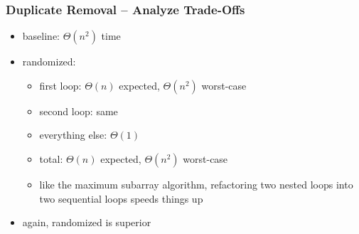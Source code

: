 \documentclass[10pt]{beamer}
\begin{document}
\begin{frame} \frametitle{Duplicate Removal -- Analyze Trade-Offs}
  \begin{itemize}
    \item baseline: $\Theta(n^2)$ time
    \item randomized:
      \begin{itemize}
        \item first loop: $\Theta(n)$ expected, $\Theta(n^2)$ worst-case
        \item second loop: same
        \item everything else: $\Theta(1)$
        \item total: $\Theta(n)$ expected, $\Theta(n^2)$ worst-case
        \item like the maximum subarray algorithm, refactoring two nested loops into two sequential loops speeds things up
      \end{itemize}
    \item again, randomized is superior
  \end{itemize}
\end{frame}
\end{document}
